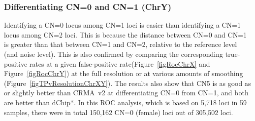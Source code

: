 \documentclass{bioinfo}
\newcommand{\TPrates}{true-positive rates\xspace}
\newcommand{\FPrate}{false-positive rate\xspace}
\begin{document}
\subsubsection{Differentiating CN=0 and CN=1 (ChrY)}
Identifying a CN=0 locus among CN=1 loci is easier than identifying a CN=1 locus among CN=2 loci.  
This is because the distance between CN=0 and CN=1 is greater than that between CN=1 and CN=2, relative to the reference level (and noise level). 
This is also confirmed by comparing the corresponding \TPrates at a given \FPrate (Figure~\ref{figRocChrX} and Figure~\ref{figRocChrY}) at the full resolution or at various amounts of smoothing (Figure~\ref{figTPvResolutionChrXY}).  
The results also show that CN5 is as good as or slightly better than CRMA~v2 at differentiating CN=0 from CN=1, and both are better than dChip*.
In this ROC analysis, which is based on 5,718 loci in 59 samples, there were in total 150,162 CN=0 (female) loci out of 305,502 loci.
\end{document}
